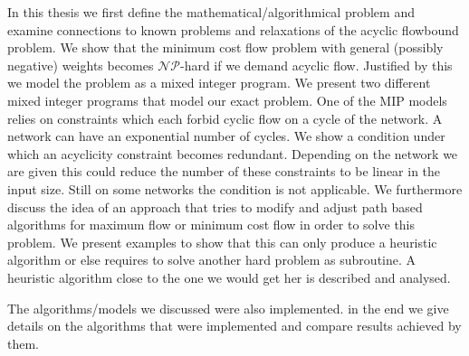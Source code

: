 In this thesis we first define the mathematical/algorithmical problem and examine connections to known problems and 
relaxations of the acyclic flowbound problem. We show that the minimum cost flow problem with general (possibly 
negative) weights becomes $\mathcal{NP}$-hard if we demand acyclic flow. 
Justified by this we model the problem as a mixed integer program. We present two different mixed integer programs 
that model our exact problem. One of the MIP models relies on constraints which each forbid cyclic flow on a cycle of 
the network. A network can have an exponential number of cycles. We show a condition under which an acyclicity 
constraint becomes redundant. Depending on the network we are given this could reduce the number of these constraints 
to be linear in the input size. Still on some networks the condition is not applicable.
We furthermore discuss the idea of an approach that tries to modify and adjust path based algorithms for maximum flow 
or minimum cost flow in order to solve this problem. We present examples to show that this can only produce a 
heuristic algorithm or else requires to solve another hard problem as subroutine. A heuristic algorithm close to the 
one we would get her is described and analysed.

The algorithms/models we discussed were also implemented. in the end we give details on the algorithms that were 
implemented and compare results achieved by them. 


